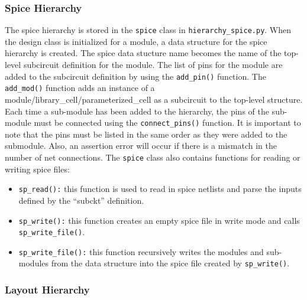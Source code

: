 \subsubsection{Spice Hierarchy}

The spice hierarchy is stored in the \verb|spice| class in
\verb|hierarchy_spice.py|.  When the design class is initialized for a
module, a data structure for the spice hierarchy is created.  The
spice data stucture name becomes the name of the top-level subcircuit
definition for the module.  The list of pins for the module are added
to the subcircuit definition by using the \verb|add_pin()| function.
The \verb|add_mod()| function adds an instance of a
module/library\_cell/parameterized\_cell as a subcircuit to the
top-level structure.  Each time a sub-module has been added to the
hierarchy, the pins of the sub-module must be connected using the
\verb|connect_pins()| function.  It is important to note that the pins
must be listed in the same order as they were added to the submodule.
Also, an assertion error will occur if there is a mismatch in the
number of net connections.  The \verb|spice| class also contains
functions for reading or writing spice files:
\begin{itemize}
\item \verb|sp_read():| this function is used to read in spice
  netlists and parse the inputs defined by the ``subckt'' definition.
\item \verb|sp_write():| this function creates an empty spice file in
  write mode and calls \verb|sp_write_file()|.
\item \verb|sp_write_file():| this function recursively writes the
  modules and sub-modules from the data structure into the spice file
  created by \verb|sp_write()|.
\end{itemize}

\subsubsection{Layout Hierarchy}


